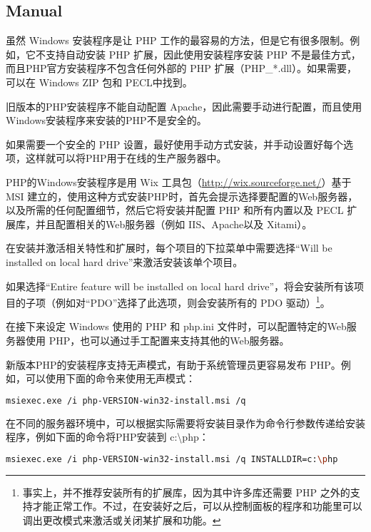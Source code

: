 \subsection{Manual}


虽然 Windows 安装程序是让 PHP 工作的最容易的方法，但是它有很多限制。例如，它不支持自动安装 PHP 扩展，因此使用安装程序安装 PHP 不是最佳方式，而且PHP官方安装程序不包含任何外部的 PHP 扩展（PHP\_*.dll）。如果需要，可以在 Windows ZIP 包和 PECL中找到。

旧版本的PHP安装程序不能自动配置 Apache，因此需要手动进行配置，而且使用Windows安装程序来安装的PHP不是安全的。

如果需要一个安全的 PHP 设置，最好使用手动方式安装，并手动设置好每个选项，这样就可以将PHP用于在线的生产服务器中。

PHP的Windows安装程序是用 Wix 工具包（\url{http://wix.sourceforge.net/}）基于 MSI 建立的，使用这种方式安装PHP时，首先会提示选择要配置的Web服务器，以及所需的任何配置细节，然后它将安装并配置 PHP 和所有内置以及 PECL 扩展库，并且配置相关的Web服务器（例如 IIS、Apache以及 Xitami）。

在安装并激活相关特性和扩展时，每个项目的下拉菜单中需要选择“Will be installed on local hard drive”来激活安装该单个项目。

如果选择“Entire feature will be installed on local hard drive”，将会安装所有该项目的子项（例如对“PDO”选择了此选项，则会安装所有的 PDO 驱动）\footnote{事实上，并不推荐安装所有的扩展库，因为其中许多库还需要 PHP 之外的支持才能正常工作。不过，在安装好之后，可以从控制面板的程序和功能里可以调出更改模式来激活或关闭某扩展和功能。}。

在接下来设定 Windows 使用的 PHP 和 php.ini 文件时，可以配置特定的Web服务器使用 PHP，也可以通过手工配置来支持其他的Web服务器。


新版本PHP的安装程序支持无声模式，有助于系统管理员更容易发布 PHP。例如，可以使用下面的命令来使用无声模式：

\begin{lstlisting}[language=bash]
msiexec.exe /i php-VERSION-win32-install.msi /q
\end{lstlisting}

在不同的服务器环境中，可以根据实际需要将安装目录作为命令行参数传递给安装程序，例如下面的命令将PHP安装到 c:{\textbackslash}php：

\begin{lstlisting}[language=bash]
msiexec.exe /i php-VERSION-win32-install.msi /q INSTALLDIR=c:\php
\end{lstlisting}

